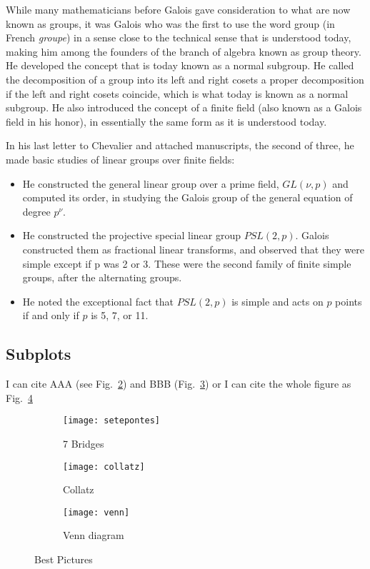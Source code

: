While many mathematicians before Galois gave consideration to what are now known as groups, it was Galois who was the first to use the word group (in French {\it groupe}) in a sense close to the technical sense that is understood today, making him among the founders of the branch of algebra known as group theory. He developed the concept that is today known as a normal subgroup. He called the decomposition of a group into its left and right cosets a proper decomposition if the left and right cosets coincide, which is what today is known as a normal subgroup. He also introduced the concept of a finite field (also known as a Galois field in his honor), in essentially the same form as it is understood today.

In his last letter to Chevalier and attached manuscripts, the second of three, he made basic studies of linear groups over finite fields:

\begin{itemize}
    \item He constructed the general linear group over a prime field, $GL(\nu, p)$ and computed its order, in studying the Galois group of the general equation of degree $p^\nu$.
    \item He constructed the projective special linear group $PSL(2,p)$. Galois constructed them as fractional linear transforms, and observed that they were simple except if p was 2 or 3. These were the second family of finite simple groups, after the alternating groups.
    \item He noted the exceptional fact that $PSL(2,p)$ is simple and acts on $p$ points if and only if $p$ is 5, 7, or 11.
\end{itemize}


\begin{landscape}

\section*{Subplots}
I can cite AAA (see Fig.~\ref{fig:Collatz}) and BBB (Fig.~\ref{fig:Figure2}) or I can cite the whole figure as Fig.~\ref{fig:animations}


\begin{figure}
  \centering
  \begin{subfigure}[b]{0.55\textwidth}
    \texttt{[image: setepontes]}
    \caption{7 Bridges}
    \label{fig:7 Bridges}
  \end{subfigure}
  \begin{subfigure}[b]{0.42\textwidth}
    \texttt{[image: collatz]}
    \caption{Collatz}
    \label{fig:Collatz}
  \end{subfigure}
  \begin{subfigure}[b]{0.42\textwidth}
    \texttt{[image: venn]}
    \caption{Venn diagram}
    \label{fig:Figure2}
  \end{subfigure}
  \caption{Best Pictures}
  \label{fig:animations}
\end{figure}

\end{landscape}

